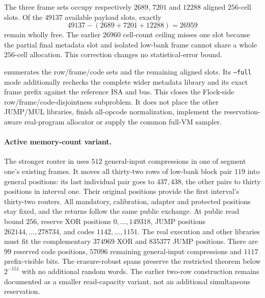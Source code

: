 The three frame sets occupy respectively $2689$, $7201$ and $12288$ aligned $256$-cell slots. Of the $49137$ available payload slots, exactly
\[
 49137-(2689+7201+12288)=26959
\]
remain wholly free. The earlier $26960$ cell-count ceiling misses one slot because the partial final metadata slot and isolated low-bank frame cannot share a whole $256$-cell allocation. This correction changes no statistical-error bound.

 enumerates the row/frame/code sets and the remaining aligned slots. Its \texttt{--full} mode additionally rechecks the complete wider metadata library and its exact frame prefix against the reference ISA and bus. This closes the Flock-side row/frame/code-disjointness subproblem. It does not place the other JUMP/MUL libraries, finish all-opcode normalization, implement the reservation-aware real-program allocator or supply the common full-VM sampler.

\paragraph{Active memory-count variant.} The stronger router in  uses $512$ general-input compressions in one of segment one's existing frames. It moves all thirty-two rows of low-bank block pair $119$ into general positions: its last individual pair goes to $437,438$, the other pairs to thirty positions in interval one. Their original positions provide the first interval's thirty-two routers. All mandatory, calibration, adapter and protected positions stay fixed, and the returns follow the same public exchange. At public read bound $256$, reserve XOR positions $0,\ldots,149318$, JUMP positions $262144,\ldots,278734$, and codes $1142,\ldots,1151$. The real execution and other libraries must fit the complementary $374969$ XOR and $835377$ JUMP positions. There are $99$ reserved code positions, $57096$ remaining general-input compressions and $1117$ prefix-visible bits. The erasure-robust spans preserve the restricted theorem below $2^{-151}$ with no additional random words. The earlier two-row construction remains documented as a smaller read-capacity variant, not an additional simultaneous reservation.

